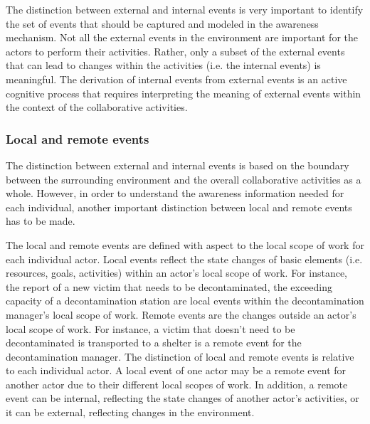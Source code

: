 The distinction between external and internal events is very important to identify the set of events that should be captured and modeled in the awareness mechanism. Not all the external events in the environment are important for the actors to perform their activities. Rather, only a subset of the external events that can lead to changes within the activities (i.e. the internal events) is meaningful. The derivation of internal events from external events is an active cognitive process that requires interpreting the meaning of external events within the context of the collaborative activities.

\subsubsection{Local and remote events} %
\label{ssub:local_and_remote_events}
The distinction between external and internal events is based on the boundary between the surrounding environment and the overall collaborative activities as a whole. However, in order to understand the awareness information needed for each individual, another important distinction between local and remote events has to be made. 

The local and remote events are defined with aspect to the local scope of work for each individual actor. Local events reflect the state changes of basic elements (i.e. resources, goals, activities) within an actor’s local scope of work. For instance, the report of a new victim that needs to be decontaminated, the exceeding capacity of a decontamination station are local events within the decontamination manager’s local scope of work. Remote events are the changes outside an actor’s local scope of work. For instance, a victim that doesn’t need to be decontaminated is transported to a shelter is a remote event for the decontamination manager. The distinction of local and remote events is relative to each individual actor. A local event of one actor may be a remote event for another actor due to their different local scopes of work. In addition, a remote event can be internal, reflecting the state changes of another actor’s activities, or it can be external, reflecting changes in the environment. 

